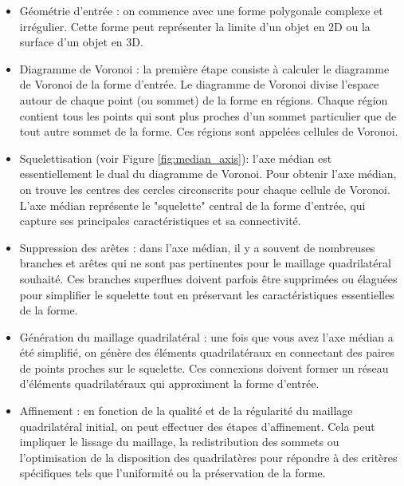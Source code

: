 \begin{itemize}
    \item  Géométrie d'entrée : on commence avec une forme polygonale complexe et irrégulier. Cette forme peut représenter la limite d'un objet en 2D ou la surface d'un objet en 3D.\\

    \item Diagramme de Voronoi : la première étape consiste à calculer le diagramme de Voronoi de la forme d'entrée. Le diagramme de Voronoi divise l'espace autour de chaque point (ou sommet) de la forme en régions. Chaque région contient tous les points qui sont plus proches d'un sommet particulier que de tout autre sommet de la forme. Ces régions sont appelées cellules de Voronoi.\\

    \item Squelettisation (voir Figure \ref{fig:median_axis}): l'axe médian est essentiellement le dual du diagramme de Voronoi. Pour obtenir l'axe médian, on trouve les centres des cercles circonscrits pour chaque cellule de Voronoi. L'axe médian représente le "squelette" central de la forme d'entrée, qui capture ses principales caractéristiques et sa connectivité.\\

    \item Suppression des arêtes : dans l'axe médian, il y a souvent de nombreuses branches et arêtes qui ne sont pas pertinentes pour le maillage quadrilatéral souhaité. Ces branches superflues doivent parfois être supprimées ou élaguées pour simplifier le squelette tout en préservant les caractéristiques essentielles de la forme.\\

    \item Génération du maillage quadrilatéral : une fois que vous avez l'axe médian a été simplifié, on génère des éléments quadrilatéraux en connectant des paires de points proches sur le squelette. Ces connexions doivent former un réseau d'éléments quadrilatéraux qui approximent la forme d'entrée.\\

    \item Affinement : en fonction de la qualité et de la régularité du maillage quadrilatéral initial, on peut effectuer des étapes d'affinement. Cela peut impliquer le lissage du maillage, la redistribution des sommets ou l'optimisation de la disposition des quadrilatères pour répondre à des critères spécifiques tels que l'uniformité ou la préservation de la forme.\\
\end{itemize}

